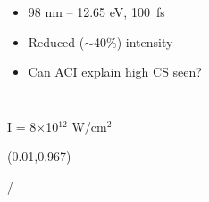 \documentclass{beamer}
\makeatletter
\newcommand{\framenumber}{
\begin{textblock}{0}(0.01,0.967)
\begin{scriptsize}
{\color{gray}\insertframenumber/\inserttotalframenumber}
\end{scriptsize}
\end{textblock}
}
\makeatother
\begin{document}
\begin{frame}{}
\begin{columns}
        \begin{itemize}
            \item<1-> 98 nm -- 12.65 eV, 100~fs
            \item<2-> Reduced ($\sim$40\%) intensity
            \item<3-> Can ACI explain high CS seen?
        \end{itemize}

    \end{columns}
\end{frame}

\begin{frame}{I = 8$\times$10$^{12}$ W/cm$^2$}\framenumber
{}
\begin{columns}
    \begin{center}{}\end{center}
    \begin{center}{}\end{center}

\end{columns}
\end{frame}
\end{document}
